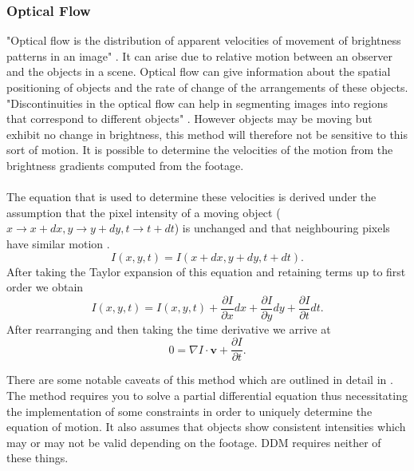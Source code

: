 \documentclass[10pt]{article}
\begin{document}
\subsubsection{Optical Flow}
"Optical flow is the distribution of apparent velocities of movement of brightness patterns in an image" \cite{optical_flow}. It can arise due to relative motion between an observer and the objects in a scene. Optical flow can give information about the spatial positioning of objects and the rate of change of the arrangements of these objects. "Discontinuities in the optical flow can help in segmenting images into regions that correspond to different objects" \cite{optical_flow}. However objects may be moving but exhibit no change in brightness, this method will therefore not be sensitive to this sort of motion. It is possible to determine the velocities of the motion from the brightness gradients computed from the footage.
\\\\
The equation that is used to determine these velocities is derived under the assumption that the pixel intensity of a moving object ($x \rightarrow x + dx, y \rightarrow y + dy, t \rightarrow t + dt $) is unchanged and that neighbouring pixels have similar motion \cite{optical_flow_opencv}.
\begin{equation}
I(x, y, t) = I(x + dx, y + dy, t + dt).
\end{equation}
After taking the Taylor expansion of this equation and retaining terms up to first order we obtain
\begin{equation}
I(x, y, t) = I(x, y, t) + \frac{\partial I}{\partial x} dx + \frac{\partial I}{\partial y} dy + \frac{\partial I}{\partial t} dt.
\end{equation}
After rearranging and then taking the time derivative we arrive at
\begin{equation}
0 = \nabla I \cdot \textbf{v} + \frac{\partial I}{\partial t}.
\end{equation}
 
There are some notable caveats of this method which are outlined in detail in \cite{optical_flow}. The method requires you to solve a partial differential equation thus necessitating the implementation of some constraints in order to uniquely determine the equation of motion. It also assumes that objects show consistent intensities which may or may not be valid depending on the footage. DDM requires neither of these things.
\end{document}
